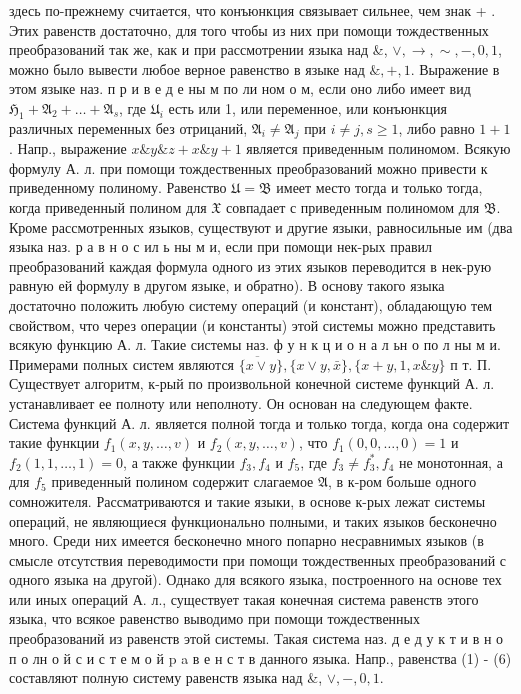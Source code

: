 \documentclass[10pt]{article}
\begin{document}
здесь по-прежнему считается, что конъюнкция связывает сильнее, чем знак + . Этих равенств достаточно, для того чтобы из них при помощи тождественных преобразований так же, как и при рассмотрении языка над \&, $\vee, \rightarrow, \sim,-, 0,1$, можно было вывести любое верное равенство в языке над $\&,+, 1$. Выражение в этом языке наз. п р и в е д е ны м по ли ном о м, если оно либо имеет вид $\mathfrak{H}_{1}+\mathfrak{A}_{2}+\ldots+\mathfrak{A}_{s}$, где $\mathfrak{U}_{i}$ есть или 1, или переменное, или конъюнкция различных переменных без отрицаний, $\mathfrak{A}_{i} \neq \mathfrak{A}_{j}$ при $i \neq j, s \geqslant 1$, либо равно $1+1$. Напр., выражение $x \& y \& z+x \& y+1$ является приведенным полиномом. Всякую формулу А. л. при помощи тождественных преобразований можно привести к приведенному полиному. Равенство $\mathfrak{U}=\mathfrak{B}$ имеет место тогда и только тогда, когда приведенный полином для $\mathfrak{X}$ совпадает с приведенным полиномом для $\mathfrak{B}$. Кроме рассмотренных языков, существуют и другие языки, равносильные им (два языка наз. р а в н о с ил ь ны м и, если при помощи нек-рых правил преобразований каждая формула одного из этих языков переводится в нек-рую равную ей формулу в другом языке, и обратно). В основу такого языка достаточно положить любую систему операций (и констант), обладающую тем свойством, что через операции (и константы) этой системы можно представить всякую функцию А. л. Такие системы наз. ф у н к ц и о н а л ьн о по л ны м и. Примерами полных систем являются $\overline{\{x \vee y}\},\{x \vee y, \bar{x}\},\{x+y, 1, x \& y\}$ п т. П. Существует алгоритм, к-рый по произвольной конечной системе функций А. л. устанавливает ее полноту или неполноту. Он основан на следующем факте. Система функций А. л. является полной тогда и только тогда, когда она содержит такие функции $f_{1}(x, y, \ldots, v)$ и $f_{2}(x, y, \ldots, v)$, что $f_{1}(0,0, \ldots, 0)=1$ и $f_{2}(1,1, \ldots, 1)=0$, а также функции $f_{3}, f_{4}$ и $f_{5}$, где $f_{3} \neq f_{3}^{*}, f_{4}$ не монотонная, а для $f_{5}$ приведенный полином содержит слагаемое $\mathfrak{A}$, в к-ром больше одного сомножителя. Рассматриваются и такие языки, в основе к-рых лежат системы операций, не являющиеся функционально полными, и таких языков бесконечно много. Среди них имеется бесконечно много попарно несравнимых языков (в смысле отсутствия переводимости при помощи тождественных преобразований с одного языка на другой). Однако для всякого языка, построенного на основе тех или иных операций А. л., существует такая конечная система равенств этого языка, что всякое равенство выводимо при помощи тождественных преобразований из равенств этой системы. Такая система наз. д е д у к т и в н о п о лн о й с и с т е м о й $\mathrm{p}$ a в е н с т в данного языка. Напр., равенства (1) - (6) составляют полную систему равенств языка над \&, $\vee,-, 0,1$.
\end{document}
